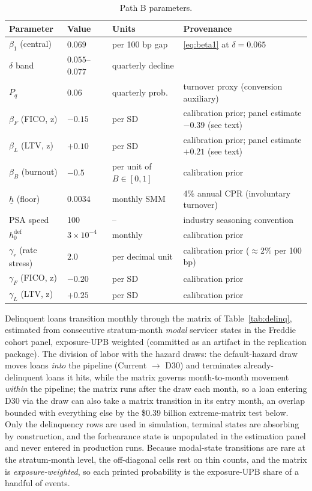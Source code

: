 \documentclass[12pt]{article}
\begin{document}
\begin{table}[H]
\centering
\footnotesize
\setlength{\tabcolsep}{4pt}
\begin{threeparttable}
\caption{Path B parameters.}
\label{tab:params}
\begin{tabular}{@{}llll@{}}
\toprule
Parameter & Value & Units & Provenance \\
\midrule
$\beta_1$ (central) & $0.069$ & per 100 bp gap & \eqref{eq:beta1} at $\delta = 0.065$ \citep{liebersohn2024} \\
$\delta$ band & $0.055$--$0.077$ & quarterly decline & \citet{liebersohn2024} \\
$P_q$ & $0.06$ & quarterly prob. & turnover proxy (conversion auxiliary) \\
$\beta_F$ (FICO, z) & $-0.15$ & per SD & calibration prior; panel estimate $-0.39$ (see text) \\
$\beta_L$ (LTV, z) & $+0.10$ & per SD & calibration prior; panel estimate $+0.21$ (see text) \\
$\beta_B$ (burnout) & $-0.5$ & per unit of $B \in [0,1]$ & calibration prior \\
$\underline{h}$ (floor) & $0.0034$ & monthly SMM & 4\% annual CPR (involuntary turnover) \\
PSA speed & 100 & -- & industry seasoning convention \\
$h^{\mathrm{def}}_0$ & $3\times10^{-4}$ & monthly & calibration prior \\
$\gamma_r$ (rate stress) & $2.0$ & per decimal unit & calibration prior ($\approx$2\% per 100 bp) \\
$\gamma_F$ (FICO, z) & $-0.20$ & per SD & calibration prior \\
$\gamma_L$ (LTV, z) & $+0.25$ & per SD & calibration prior \\
\bottomrule
\end{tabular}
\end{threeparttable}
\end{table}

Delinquent loans transition monthly through the matrix of Table~\ref{tab:delinq}, estimated from consecutive stratum-month \emph{modal} servicer states in the Freddie cohort panel, exposure-UPB weighted (committed as an artifact in the replication package). The division of labor with the hazard draws: the default-hazard draw moves loans \emph{into} the pipeline (Current $\to$ D30) and terminates already-delinquent loans it hits, while the matrix governs month-to-month movement \emph{within} the pipeline; the matrix runs after the draw each month, so a loan entering D30 via the draw can also take a matrix transition in its entry month, an overlap bounded with everything else by the \$0.39 billion extreme-matrix test below. Only the delinquency rows are used in simulation, terminal states are absorbing by construction, and the forbearance state is unpopulated in the estimation panel and never entered in production runs. Because modal-state transitions are rare at the stratum-month level, the off-diagonal cells rest on thin counts, and the matrix is \emph{exposure-weighted}, so each printed probability is the exposure-UPB share of a handful of events.
\end{document}
